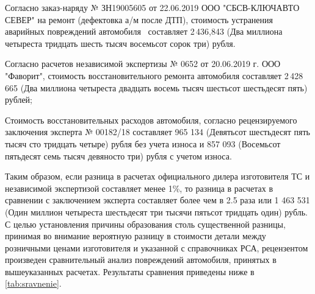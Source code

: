 \par Согласно заказ-наряду № ЗН19005605 от 22.06.2019 ООО "СБСВ-КЛЮЧАВТО СЕВЕР" на ремонт (дефектовка а/м после ДТП), стоимость устранения аварийных повреждений автомобиля  \, составляет 2\,436,843 (Два миллиона четыреста тридцать шесть тысяч восемьсот сорок три) рубля. 
\par Согласно расчетов независимой экспертизы  № 0652 от 20.06.2019 г. ООО "Фаворит", стоимость восстановительного ремонта автомобиля составляет 2\,428\,665 (Два миллиона четыреста двадцать восемь тысяч шестьсот шестьдесят пять) рублей;
\par Стоимость восстановительных расходов автомобиля, согласно рецензируемого  заключения эксперта № 00182/18  составляет 965 134 (Девятьсот шестьдесят пять тысяч сто тридцать четыре) рубля без учета износа и 857 093 (Восемьсот пятьдесят семь тысяч девяносто три) рубля с учетом износа.

Таким образом, если  разница в расчетах официального дилера изготовителя ТС и независимой экспертизой составляет менее 1\%, то разница в расчетах в сравнении с заключением эксперта составляет  более чем в 2.5 раза или 1 463 531 (Один миллион четыреста шестьдесят три тысячи пятьсот тридцать один) рубль. С целью установления причины образования столь существенной разницы, принимая во внимание вероятную разницу в стоимости детали  между розничными ценами изготовителя и указанной с справочниках РСА, рецензентом произведен сравнительный анализ повреждений автомобиля, принятых в вышеуказанных расчетах.   Результаты сравнения приведены ниже в \ref*{tab:sravnenie}.



